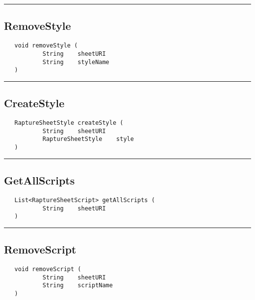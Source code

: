 \rule{15cm}{2pt}
\subsection{RemoveStyle}
\label{Api:RemoveStyle}
\begin{verbatim}
   void removeStyle (
           String    sheetURI
           String    styleName
   )
\end{verbatim}



\rule{15cm}{2pt}
\subsection{CreateStyle}
\label{Api:CreateStyle}
\begin{verbatim}
   RaptureSheetStyle createStyle (
           String    sheetURI
           RaptureSheetStyle    style
   )
\end{verbatim}



\rule{15cm}{2pt}
\subsection{GetAllScripts}
\label{Api:GetAllScripts}
\begin{verbatim}
   List<RaptureSheetScript> getAllScripts (
           String    sheetURI
   )
\end{verbatim}



\rule{15cm}{2pt}
\subsection{RemoveScript}
\label{Api:RemoveScript}
\begin{verbatim}
   void removeScript (
           String    sheetURI
           String    scriptName
   )
\end{verbatim}



